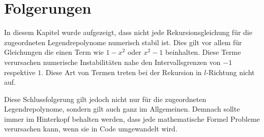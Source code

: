 %
%
%
\section{Folgerungen
\label{legendre:section:folgerungen}}
In diesem Kapitel wurde aufgezeigt, dass nicht jede Rekursionsgleichung für die zugeordneten Legendrepolynome numerisch stabil ist.
Dies gilt vor allem für Gleichungen die einen Term wie $1-x^2$ oder $x^2-1$ beinhalten.
Diese Terme verursachen numerische Instabilitäten nahe den Intervallsgrenzen von $-1$ respektive $1$.
Diese Art von Termen treten bei der Rekursion in $l$-Richtung nicht auf.


Diese Schlussfolgerung gilt jedoch nicht nur für die zugeordneten Legendrepolynome, sondern gilt auch ganz im Allgemeinen.
Demnach sollte immer im Hinterkopf behalten werden, dass jede mathematische Formel Probleme verursachen kann, wenn sie in Code umgewandelt wird.
